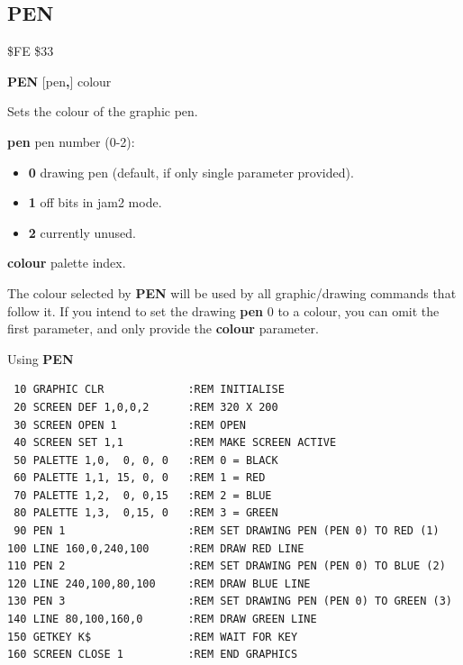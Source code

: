 \subsection{PEN}
\begin{description}[leftmargin=2cm,style=nextline]
\item [Token:] \$FE \$33
\item [Format:] {\bf PEN} [pen{\bf,}] colour
\item [Usage:]  Sets the colour of the graphic pen.

                {\bf pen} pen number (0-2):
                \begin{itemize}
                    \item {\bf 0} drawing pen (default, if only single parameter provided).
                    \item {\bf 1} off bits in jam2 mode.
                    \item {\bf 2} currently unused.
                \end{itemize}

                {\bf colour} palette index.

\item [Remarks:] The colour selected by {\bf PEN} will be used by all
                 graphic/drawing commands that follow it.
                 If you intend to set the drawing {\bf pen} 0 to a colour, you can
                 omit the first parameter, and only provide the {\bf colour} parameter.

\item [Example:] Using {\bf PEN}

\begin{tcolorbox}[colback=black,coltext=white]
\verbatimfont{\codefont}
\begin{verbatim}
 10 GRAPHIC CLR             :REM INITIALISE
 20 SCREEN DEF 1,0,0,2      :REM 320 X 200
 30 SCREEN OPEN 1           :REM OPEN
 40 SCREEN SET 1,1          :REM MAKE SCREEN ACTIVE
 50 PALETTE 1,0,  0, 0, 0   :REM 0 = BLACK
 60 PALETTE 1,1, 15, 0, 0   :REM 1 = RED
 70 PALETTE 1,2,  0, 0,15   :REM 2 = BLUE
 80 PALETTE 1,3,  0,15, 0   :REM 3 = GREEN
 90 PEN 1                   :REM SET DRAWING PEN (PEN 0) TO RED (1)
100 LINE 160,0,240,100      :REM DRAW RED LINE
110 PEN 2                   :REM SET DRAWING PEN (PEN 0) TO BLUE (2)
120 LINE 240,100,80,100     :REM DRAW BLUE LINE
130 PEN 3                   :REM SET DRAWING PEN (PEN 0) TO GREEN (3)
140 LINE 80,100,160,0       :REM DRAW GREEN LINE
150 GETKEY K$               :REM WAIT FOR KEY
160 SCREEN CLOSE 1          :REM END GRAPHICS
\end{verbatim}
\end{tcolorbox}
\end{description}



